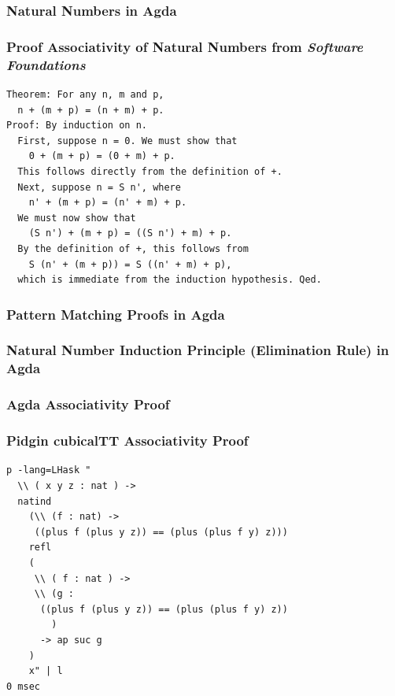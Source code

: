 \documentclass[9pt]{beamer}
\begin{document}
\begin{frame}
\frametitle{Natural Numbers in Agda}

\end{frame}

\begin{frame}[fragile]
\frametitle{Proof Associativity of Natural Numbers from \emph{Software Foundations}}
\begin{verbatim}
Theorem: For any n, m and p,
  n + (m + p) = (n + m) + p.
Proof: By induction on n.
  First, suppose n = 0. We must show that
    0 + (m + p) = (0 + m) + p.
  This follows directly from the definition of +.
  Next, suppose n = S n', where
    n' + (m + p) = (n' + m) + p.
  We must now show that
    (S n') + (m + p) = ((S n') + m) + p.
  By the definition of +, this follows from
    S (n' + (m + p)) = S ((n' + m) + p),
  which is immediate from the induction hypothesis. Qed.
\end{verbatim}
\end{frame}

\begin{frame}
\frametitle{Pattern Matching Proofs in Agda}



\end{frame}

\begin{frame}

\frametitle{Natural Number Induction Principle (Elimination Rule) in Agda}


\end{frame}

\begin{frame}
\frametitle{Agda Associativity Proof}


\end{frame}


\begin{frame}[fragile]
\frametitle{Pidgin cubicalTT Associativity Proof}

\begin{verbatim}
p -lang=LHask "
  \\ ( x y z : nat ) -> 
  natind 
    (\\ (f : nat) -> 
     ((plus f (plus y z)) == (plus (plus f y) z))) 
    refl 
    ( 
     \\ ( f : nat ) -> 
     \\ (g : 
      ((plus f (plus y z)) == (plus (plus f y) z))
        ) 
      -> ap suc g  
    ) 
    x" | l
0 msec

\end{verbatim}

\end{frame}
\end{document}
